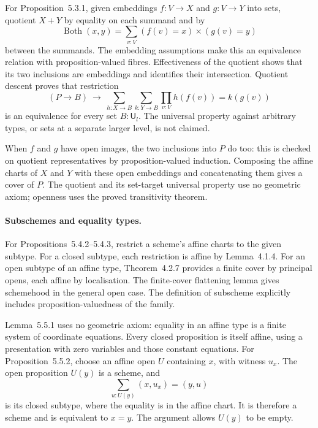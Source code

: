 \documentclass[11pt]{article}
\newcommand{\U}{\mathsf{U}}
\theoremstyle{remark}
\begin{document}
For Proposition~5.3.1, given embeddings $f:V\to X$ and $g:V\to Y$
into sets, quotient $X+Y$ by equality on each summand and by
\[
 \operatorname{Both}(x,y)=
       \sum_{v:V}(f(v)=x)\mathbin{\times}(g(v)=y)
\]
between the summands. The embedding assumptions make this an equivalence
relation with proposition-valued fibres. Effectiveness of the quotient
shows that its two inclusions are embeddings and identifies their
intersection. Quotient descent proves that restriction
\[
 (P\to B)\ \longrightarrow\
 \sum_{h:X\to B}\sum_{k:Y\to B}\prod_{v:V} h(f(v))=k(g(v))
\]
is an equivalence for every set $B:\U_l$. The universal property
against arbitrary types, or sets at a separate larger level, is not
claimed.

When $f$ and $g$ have open images, the two inclusions into $P$ do too:
this is checked on quotient representatives by proposition-valued
induction. Composing the affine charts of $X$ and $Y$ with these open
embeddings and concatenating them gives a cover of $P$.
The quotient and its set-target universal property use no geometric
axiom; openness uses the proved transitivity theorem.

\paragraph{Subschemes and equality types.}
For Propositions~5.4.2--5.4.3, restrict a scheme's affine charts to the
given subtype. For a closed subtype, each restriction is affine by
Lemma~4.1.4. For an open subtype of an affine type, Theorem~4.2.7
provides a finite cover by principal opens, each affine by localisation.
The finite-cover flattening lemma gives schemehood in the general
open case. The definition of subscheme explicitly includes
proposition-valuedness of the family.

Lemma~5.5.1 uses no geometric axiom: equality in an affine type is a
finite system of coordinate equations. Every closed proposition is
itself affine, using a presentation with zero variables and those
constant equations.
For Proposition~5.5.2, choose an affine open $U$ containing $x$, with
witness $u_x$. The open proposition $U(y)$ is a scheme, and
\[
             \sum_{u:U(y)} (x,u_x)=(y,u)
\]
is its closed subtype, where the equality is in the affine chart.
It is therefore a scheme and is equivalent to $x=y$.
The argument allows $U(y)$ to be empty.
\end{document}
